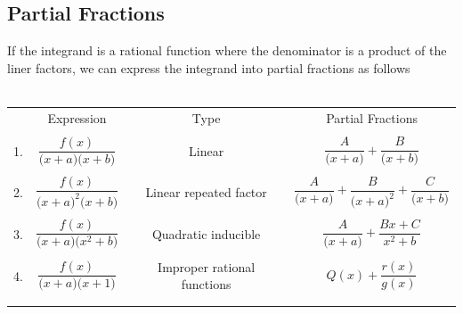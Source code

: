 \documentclass[11pt,a4paper]{article}
\begin{document}
\subsection{Partial Fractions}
If the integrand is a rational function where the denominator is a product of the liner factors, we can express the integrand into partial fractions as follows\\\\



\begin{table}[H]
\centering
\begin{tabular}{cccccc}
& Expression && Type && Partial Fractions\\
&&&&&\\
1. & $\dfrac{f(x)}{\big(x + a\big)\big(x + b\big)}$ && Linear && $\dfrac{A}{\big(x + a\big)} + \dfrac{B}{\big(x + b\big)}$\\
&&&&&\\
2. & $\dfrac{f(x)}{\big(x + a\big)^2\big(x + b\big)}$ && Linear repeated factor && $\dfrac{A}{\big( x + a\big)} + \dfrac{B}{\big(x + a\big)^2} + \dfrac{C}{\big(x + b\big)}$\\
&&&&&\\
3.& $\dfrac{f(x)}{\big(x + a\big) \big(x^2 + b\big)}$ && Quadratic inducible && $\dfrac{A}{\big(x + a\big)} + \dfrac{Bx + C}{x^2 + b}$\\
&&&&&\\
4. & $\dfrac{f(x)}{\big(x + a\big)\big( x + 1\big)}$ && Improper rational functions && $Q(x) + \dfrac{r(x)}{g(x)}$\\
&&&&&\\\\
\end{tabular}
\end{table}
\end{document}
